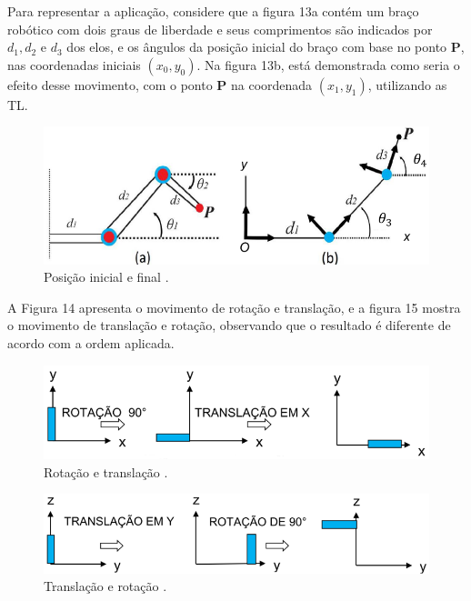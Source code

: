 Para representar a aplicação, considere que a figura 13a contém um braço robótico com dois graus de liberdade e seus comprimentos são indicados por $d_1, d_2$ e $d_3$ dos elos, e os ângulos da posição inicial do braço com base no ponto $\mathbf{P}$, nas coordenadas iniciais $(x_0, y_0)$. Na figura 13b, está demonstrada como seria o efeito desse movimento, com o ponto $\mathbf{P}$ na coordenada $(x_1, y_1)$, utilizando as TL.

\begin{figure}[H]
	\centering
	\includegraphics[scale=0.70]{a_robo2.png}
	\caption{Posição inicial e final \cite{sirlandro2017}.}
\end{figure} 

A Figura 14 apresenta o movimento de rotação e translação, e a figura 15 mostra o movimento de translação e rotação, observando que o resultado é diferente de acordo com a ordem aplicada.

\begin{figure}[H]
	\centering
	\includegraphics[scale=0.80]{a_robo3.png}
	\caption{Rotação e translação \cite{sirlandro2017}.}
\end{figure} 

\begin{figure}[H]
	\centering
	\includegraphics[scale=0.80]{a_robo4.png}
	\caption{Translação e rotação \cite{sirlandro2017}.}
\end{figure} 

